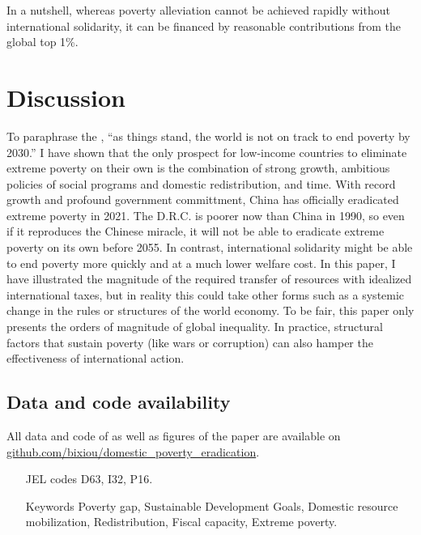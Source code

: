 \documentclass[12pt,english]{article}
\begin{document}
In a nutshell, whereas poverty alleviation cannot be achieved rapidly without international solidarity, it can be financed by reasonable contributions from the global top 1\%.

\section{Discussion} 

To paraphrase the \cite{un_sustainable_2022}, ``as things stand, the world is not on track to end poverty by 2030.'' I have shown that the only prospect for low-income countries to eliminate extreme poverty on their own is the combination of strong growth, ambitious policies of social programs and domestic redistribution, and time. 
With record growth and profound government committment, China has officially eradicated extreme poverty in 2021. The D.R.C. is poorer now than China in 1990, %
so even if it reproduces the Chinese miracle, it will not be able to eradicate extreme poverty on its own before 2055. 
In contrast, international solidarity might be able to end poverty more quickly and at a much lower welfare cost. In this paper, I have illustrated the magnitude of the required transfer of resources with idealized international taxes, but in reality this could take other forms such as a systemic change in the rules or structures of the world economy. 
To be fair, this paper only presents the orders of magnitude of global inequality. %
In practice, structural factors that sustain poverty (like wars or corruption) %
can also hamper the effectiveness of international action. %


  \begin{small} %





\section*{\normalsize Data and code availability}

All data and code of as well as figures of the paper are available on \href{https://github.com/bixiou/domestic_poverty_eradication}{github.com/bixiou/domestic\_poverty\_eradication}. 

\end{small}  %

\renewcommand{\url}[1]{\href{#1}{Link}} %


\begin{itemize}
\item[JEL codes] D63, I32, P16.
\item[Keywords]  Poverty gap, Sustainable Development Goals, Domestic resource mobilization, Redistribution, Fiscal capacity, Extreme poverty.
\end{itemize}
\end{document}
